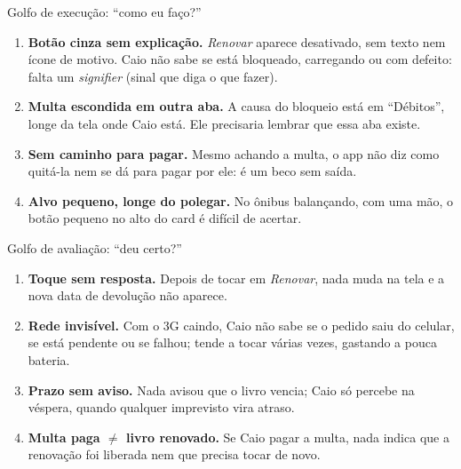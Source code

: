 \documentclass[10pt,a4paper]{article}
\begin{document}
\begin{tcbraster}[raster columns=2,raster equal height,raster column skip=8pt,raster before skip=6pt]
\begin{caixa}{Golfo de execução: ``como eu faço?''}
\begin{enumerate}[label=\textbf{E\arabic*.},leftmargin=2em,itemsep=5pt]
  \item \textbf{Botão cinza sem explicação.} \textit{Renovar} aparece desativado, sem texto nem ícone de motivo. Caio não sabe se está bloqueado, carregando ou com defeito: falta um \textit{signifier} (sinal que diga o que fazer).
  \item \textbf{Multa escondida em outra aba.} A causa do bloqueio está em ``Débitos'', longe da tela onde Caio está. Ele precisaria lembrar que essa aba existe.
  \item \textbf{Sem caminho para pagar.} Mesmo achando a multa, o app não diz como quitá-la nem se dá para pagar por ele: é um beco sem saída.
  \item \textbf{Alvo pequeno, longe do polegar.} No ônibus balançando, com uma mão, o botão pequeno no alto do card é difícil de acertar.
\end{enumerate}
\end{caixa}
\begin{caixa}[laranja]{Golfo de avaliação: ``deu certo?''}
\begin{enumerate}[label=\textbf{A\arabic*.},leftmargin=2em,itemsep=5pt]
  \item \textbf{Toque sem resposta.} Depois de tocar em \textit{Renovar}, nada muda na tela e a nova data de devolução não aparece.
  \item \textbf{Rede invisível.} Com o 3G caindo, Caio não sabe se o pedido saiu do celular, se está pendente ou se falhou; tende a tocar várias vezes, gastando a pouca bateria.
  \item \textbf{Prazo sem aviso.} Nada avisou que o livro vencia; Caio só percebe na véspera, quando qualquer imprevisto vira atraso.
  \item \textbf{Multa paga $\neq$ livro renovado.} Se Caio pagar a multa, nada indica que a renovação foi liberada nem que precisa tocar de novo.
\end{enumerate}
\end{caixa}
\end{tcbraster}
\end{document}
